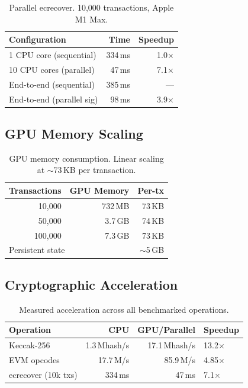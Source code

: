 \documentclass[11pt]{article}
\begin{document}
\begin{table}[h]
\centering
\small
\begin{tabular}{lrr}
\toprule
\textbf{Configuration} & \textbf{Time} & \textbf{Speedup} \\
\midrule
1 CPU core (sequential)  & 334\,ms & 1.0$\times$ \\
10 CPU cores (parallel)  & 47\,ms  & 7.1$\times$ \\
\midrule
End-to-end (sequential)  & 385\,ms & --- \\
End-to-end (parallel sig)& 98\,ms  & 3.9$\times$ \\
\bottomrule
\end{tabular}
\caption{Parallel ecrecover. 10{,}000 transactions, Apple M1 Max.}
\label{tab:ecrecover}
\end{table}

\subsection{GPU Memory Scaling}

\begin{table}[h]
\centering
\small
\begin{tabular}{rrr}
\toprule
\textbf{Transactions} & \textbf{GPU Memory} & \textbf{Per-tx} \\
\midrule
10{,}000  & 732\,MB  & 73\,KB \\
50{,}000  & 3.7\,GB  & 74\,KB \\
100{,}000 & 7.3\,GB  & 73\,KB \\
\midrule
\multicolumn{2}{l}{Persistent state} & $\sim$5\,GB \\
\bottomrule
\end{tabular}
\caption{GPU memory consumption. Linear scaling at $\sim$73\,KB per transaction.}
\label{tab:memory}
\end{table}

\subsection{Cryptographic Acceleration}

\begin{table}[h]
\centering
\small
\begin{tabular}{lrrl}
\toprule
\textbf{Operation} & \textbf{CPU} & \textbf{GPU/Parallel} & \textbf{Speedup} \\
\midrule
Keccak-256           & 1.3\,Mhash/s & 17.1\,Mhash/s & 13.2$\times$ \\
EVM opcodes          & 17.7\,M/s    & 85.9\,M/s     & 4.85$\times$ \\
ecrecover (10k txs)  & 334\,ms      & 47\,ms         & 7.1$\times$ \\
\bottomrule
\end{tabular}
\caption{Measured acceleration across all benchmarked operations.}
\label{tab:accel}
\end{table}
\end{document}
